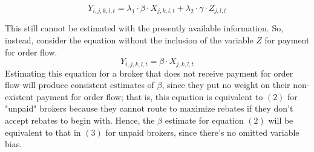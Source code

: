 \documentclass[12pt,a4paper]{article}
\begin{document}
		
		\begin{equation}
		Y_{i, j, k, l, t} = \lambda_1 \cdot \beta \cdot X_{j, k, l, t} + \lambda_2 \cdot \gamma \cdot Z_{j, l, t}
		\end{equation}
		
		This still cannot be estimated with the presently available information. So, instead, consider the equation without the inclusion of the variable $Z$ for payment for order flow. 
		\begin{equation}
		Y_{i, j, k, l, t} = \beta \cdot X_{j, k, l, t}
		\end{equation}
		Estimating this equation for a broker that does not receive payment for order flow will produce consistent estimates of $\beta$, since they put no weight on their non-existent payment for order flow; that is, this equation is equivalent to $(2)$ for "unpaid" brokers because they cannot route to maximize rebates if they don't accept rebates to begin with. Hence, the $\beta$ estimate for equation $(2)$ will be equivalent to that in $(3)$ for unpaid brokers, since there's no omitted variable bias. 
		
\end{document}
